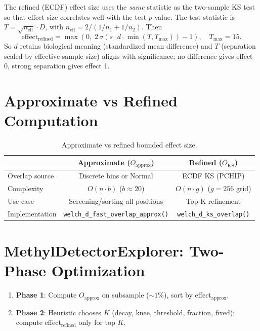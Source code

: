 \documentclass{article}
\begin{document}
The refined (ECDF) effect size uses the \emph{same} statistic as the two-sample KS test so that effect size correlates well with the test $p$-value. The test statistic is $T = \sqrt{n_{\text{eff}}} \cdot D$, with $n_{\text{eff}} = 2/(1/n_1 + 1/n_2)$. Then
\begin{equation}
    \text{effect}_{\text{refined}} = \max\left(0,\; 2\,\sigma\left( s \cdot d \cdot \min(T, T_{\max}) \right) - 1\right), \quad T_{\max} = 15.
\end{equation}
So $d$ retains biological meaning (standardized mean difference) and $T$ (separation scaled by effective sample size) aligns with significance; no difference gives effect 0, strong separation gives effect 1.

\section{Approximate vs Refined Computation}

\begin{table}[h]
\centering
\begin{tabular}{@{}lcc@{}}
\toprule
 & Approximate ($O_\text{approx}$) & Refined ($O_\text{KS}$) \\
\midrule
Overlap source & Discrete bins or Normal & ECDF KS (PCHIP) \\
Complexity & $O(n \cdot b)$ ($b \approx 20$) & $O(n \cdot g)$ ($g=256$ grid) \\
Use case & Screening/sorting all positions & Top-K refinement \\
Implementation & \texttt{welch\_d\_fast\_overlap\_approx()} & \texttt{welch\_d\_ks\_overlap()} \\
\bottomrule
\end{tabular}
\caption{Approximate vs refined bounded effect size.}
\end{table}

\section{MethylDetectorExplorer: Two-Phase Optimization}

\begin{enumerate}
    \item \textbf{Phase 1}: Compute $O_\text{approx}$ on subsample ($\sim 1\%$), sort by effect$_\text{approx}$.
    \item \textbf{Phase 2}: Heuristic chooses $K$ (decay, knee, threshold, fraction, fixed); compute effect$_\text{refined}$ only for top $K$.
\end{enumerate}
\end{document}
